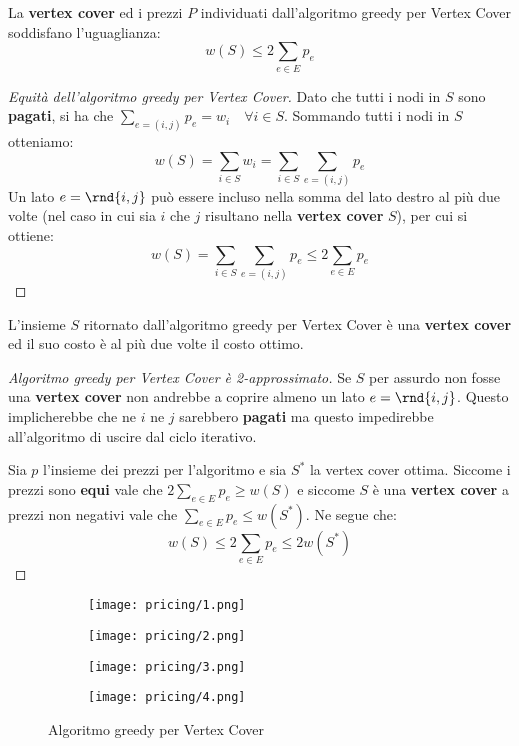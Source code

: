 \documentclass[\main/main.tex]{subfiles}
\begin{document}
\begin{multicols}{2}
\begin{definition}
\end{definition}
\clearpage
\begin{lemma}
    La \textbf{vertex cover} ed i prezzi \(P\) individuati dall'algoritmo greedy per Vertex Cover soddisfano l'uguaglianza:
    \[
        w(S) \leq 2 \sum_{e \in E} p_{e}
    \]
\end{lemma}
\begin{proof}[Equità dell'algoritmo greedy per Vertex Cover]
    Dato che tutti i nodi in \(S\) sono \textbf{pagati}, si ha che \(\sum_{e=(i, j)} p_{e}=w_{i} \quad \forall i \in S\). Sommando tutti i nodi in \(S\) otteniamo:
    \[
        w(S)=\sum_{i \in S} w_{i}=\sum_{i \in S} \sum_{e=(i, j)} p_{e}
    \]
    Un lato \(e = \rnd{i,j}\) può essere incluso nella somma del lato destro al più due volte (nel caso in cui sia \(i\) che \(j\) risultano nella \textbf{vertex cover} \(S\)), per cui si ottiene:
    \[
        w(S)=\sum_{i \in S} \sum_{e=(i, j)} p_{e} \leq 2 \sum_{e \in E} p_{e}
    \]
\end{proof}
\begin{lemma}
    L'insieme \(S\) ritornato dall'algoritmo greedy per Vertex Cover è una \textbf{vertex cover} ed il suo costo è al più due volte il costo ottimo.
\end{lemma}
\begin{proof}[Algoritmo greedy per Vertex Cover è 2-approssimato]
    Se \(S\) per assurdo non fosse una \textbf{vertex cover} non andrebbe a coprire almeno un lato \(e = \rnd{i,j}\). Questo implicherebbe che ne \(i\) ne \(j\) sarebbero \textbf{pagati} ma questo impedirebbe all'algoritmo di uscire dal ciclo iterativo.
    
    Sia \(p\) l'insieme dei prezzi per l'algoritmo e sia \(S^*\) la vertex cover ottima. Siccome i prezzi sono \textbf{equi} vale che \(2 \sum_{e \in E} p_{e} \geq w(S)\) e siccome \(S\) è una \textbf{vertex cover} a prezzi non negativi vale che \(\sum_{e \in E} p_{e} \leq w\left(S^{*}\right)\). Ne segue che:
    \[
        w(S) \leq 2 \sum_{e \in E} p_{e} \leq 2 w\left(S^{*}\right)
    \]
\end{proof}
\end{multicols}
\begin{figure}
    \begin{subfigure}{0.49\textwidth}
        \texttt{[image: pricing/1.png]}
    \end{subfigure}
    \begin{subfigure}{0.49\textwidth}
        \texttt{[image: pricing/2.png]}
    \end{subfigure}
    \begin{subfigure}{0.49\textwidth}
        \texttt{[image: pricing/3.png]}
    \end{subfigure}
    \begin{subfigure}{0.49\textwidth}
        \texttt{[image: pricing/4.png]}
    \end{subfigure}
    \caption{Algoritmo greedy per Vertex Cover}
\end{figure}
\end{document}
